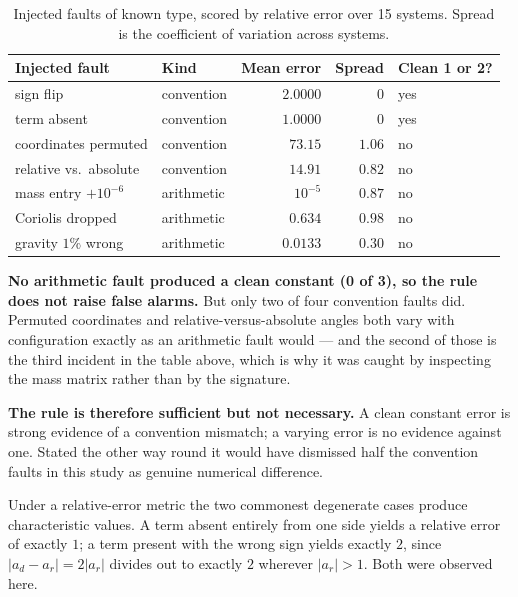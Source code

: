 \documentclass[review,12pt]{elsarticle}
\begin{document}
\begin{table}[!htbp]
\centering
\caption{Injected faults of known type, scored by relative error over 15
systems. Spread is the coefficient of variation across systems.}
\label{tab:diagnostic}
\footnotesize
\setlength{\tabcolsep}{4pt}
\begin{tabular}{@{}llrrl@{}}
\toprule
\textbf{Injected fault} & \textbf{Kind} & \textbf{Mean error} & \textbf{Spread} & \textbf{Clean 1 or 2?} \\
\midrule
sign flip             & convention & $2.0000$  & $0$        & yes \\
term absent           & convention & $1.0000$  & $0$        & yes \\
coordinates permuted  & convention & $73.15$   & $1.06$     & no \\
relative vs.\ absolute & convention & $14.91$   & $0.82$     & no \\
\addlinespace
mass entry $+10^{-6}$ & arithmetic & $10^{-5}$ & $0.87$     & no \\
Coriolis dropped      & arithmetic & $0.634$   & $0.98$     & no \\
gravity $1\%$ wrong     & arithmetic & $0.0133$  & $0.30$     & no \\
\bottomrule
\end{tabular}
\end{table}

\noindent \textbf{No arithmetic fault produced a clean constant (0 of 3), so the
rule does not raise false alarms.} But only two of four convention faults did.
Permuted coordinates and relative-versus-absolute angles both vary with
configuration exactly as an arithmetic fault would --- and the second of those
is the third incident in the table above, which is why it was caught by
inspecting the mass matrix rather than by the signature.

\textbf{The rule is therefore sufficient but not necessary.} A clean constant
error is strong evidence of a convention mismatch; a varying error is no
evidence against one. Stated the other way round it would have dismissed half
the convention faults in this study as genuine numerical difference.

Under a relative-error metric the two commonest degenerate cases produce
characteristic values. A term absent entirely from one side yields a relative
error of exactly $1$; a term present with the wrong sign yields exactly $2$,
since $|a_d - a_r| = 2|a_r|$ divides out to exactly $2$ wherever
$|a_r| > 1$. Both were observed here.
\end{document}
